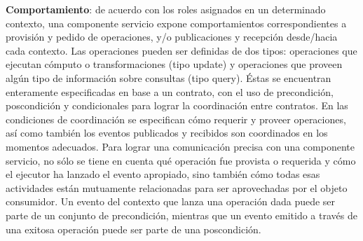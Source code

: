\textbf{Comportamiento}: de acuerdo con los roles asignados en un determinado
contexto, una componente servicio expone comportamientos correspondientes a
provisión y pedido de operaciones, y/o publicaciones y recepción desde/hacia
cada contexto. Las operaciones pueden ser definidas de dos tipos: operaciones
que ejecutan cómputo o transformaciones (tipo update) y operaciones que proveen
algún tipo de información sobre consultas (tipo query). Éstas se encuentran
enteramente especificadas en base a un contrato, con el uso de precondición,
poscondición y condicionales para lograr la coordinación entre contratos. En las
condiciones de coordinación se especifican cómo requerir y proveer operaciones,
así como también los eventos publicados y recibidos son coordinados en los
momentos adecuados. Para lograr una comunicación precisa con una componente
servicio, no sólo se tiene en cuenta qué operación fue provista o requerida
y cómo el ejecutor ha lanzado el evento apropiado, sino también cómo todas
esas actividades están mutuamente relacionadas para ser aprovechadas por el
objeto consumidor. Un evento del contexto que lanza una operación dada
puede ser parte de un conjunto de precondición, mientras que un evento emitido
a través de una exitosa operación puede ser parte de una poscondición.


